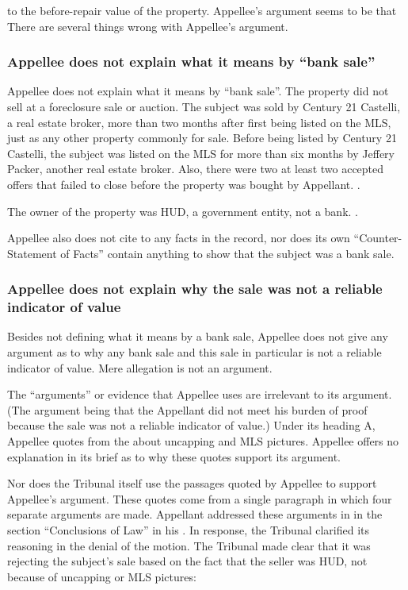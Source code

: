 \documentclass[12pt,\documentclassflag]{michiganCourtOfAppealsBrief}
\begin{document}
to the before-repair value of the property. 
Appellee's argument seems to be that There are several things wrong with Appellee's argument.

\subsubsection{Appellee does not explain what it means by ``bank sale''}
Appellee does not explain what it means by ``bank sale''. The property did not sell at a foreclosure sale or auction. The subject was sold by Century 21 Castelli, a real estate broker, more than two months after first being listed on the MLS, just as any other property commonly for sale. Before being listed by Century 21 Castelli, the subject was listed on the MLS for more than six months by Jeffery Packer, another real estate broker. Also, there were two at least two accepted offers that failed to close before the property was bought by Appellant. \mlsHistory.

The owner of the property was HUD, a government entity, not a bank. \mlsListing.

Appellee also does not cite to any facts in the record, nor does its own ``Counter-Statement of Facts'' contain anything to show that the subject was a bank sale.

\subsubsection{Appellee does not explain why the sale was not a reliable indicator of value}

Besides not defining what it means by a bank sale, Appellee does not give any argument as to why any bank sale and this sale in particular is not a reliable indicator of value. Mere allegation is not an argument. 

The ``arguments'' or evidence that Appellee uses are irrelevant to its argument. (The argument being that the Appellant did not meet his burden of proof because the sale was not a reliable indicator of value.) Under its heading A, Appellee quotes from the \foj[5] about uncapping and MLS pictures. Appellee offers no explanation in its brief as to why these quotes support its argument.

Nor does the Tribunal itself use the passages quoted by Appellee to support Appellee's argument. These quotes come from a single paragraph in which four separate arguments are made.
Appellant addressed these arguments in in the section ``Conclusions of Law'' in his \motionForReconsideration[4-5].
In response, the Tribunal clarified its reasoning in the denial of the motion. The Tribunal made clear that it was rejecting the subject's sale based on the fact that the seller was HUD, not because of uncapping or MLS pictures:
\end{document}
